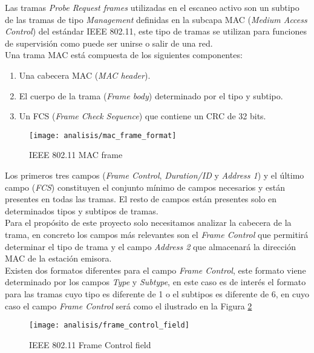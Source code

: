 \documentclass[../proyecto.tex]{subfiles}
\begin{document}
Las tramas \textit{Probe Request frames} utilizadas en el escaneo activo son un subtipo de las tramas de tipo \textit{Management} definidas en la subcapa MAC (\textit{Medium Access Control}) del estándar IEEE 802.11, este tipo de tramas se utilizan para funciones de supervisión como puede ser unirse o salir de una red.\\

Una trama MAC está compuesta de los siguientes componentes:
\begin{enumerate}
  \item Una cabecera MAC (\textit{MAC header}).
  \item El cuerpo de la trama (\textit{Frame body}) determinado por el tipo y subtipo.
  \item Un FCS (\textit{Frame Check Sequence}) que contiene un CRC de 32 bits.
\end{enumerate}

\begin{figure}[H]
\centering
\texttt{[image: analisis/mac\_frame\_format]}
\caption{IEEE 802.11 MAC frame}
\label{fig:ieee80211_mac_frame}
\end{figure}

Los primeros tres campos (\textit{Frame Control}, \textit{Duration/ID} y \textit{Address 1}) y el último campo (\textit{FCS}) constituyen el conjunto mínimo de campos necesarios y están presentes en todas las tramas. El resto de campos están presentes solo en determinados tipos y subtipos de tramas.\\

Para el propósito de este proyecto solo necesitamos analizar la cabecera de la trama, en concreto los campos más relevantes son el \textit{Frame Control} que permitirá determinar el tipo de trama y el campo \textit{Address 2} que almacenará la dirección MAC de la estación emisora.\\

Existen dos formatos diferentes para el campo \textit{Frame Control}, este formato viene determinado por los campos \textit{Type} y \textit{Subtype}, en este caso es de interés el formato para las tramas cuyo tipo es diferente de 1 o el subtipos es diferente de 6, en cuyo caso el campo \textit{Frame Control} será como el ilustrado en la Figura \ref{fig:ieee80211_frame_control_field}

\begin{figure}[H]
\centering
\texttt{[image: analisis/frame\_control\_field]}
\caption{IEEE 802.11 Frame Control field}
\label{fig:ieee80211_frame_control_field}
\end{figure}
\end{document}
